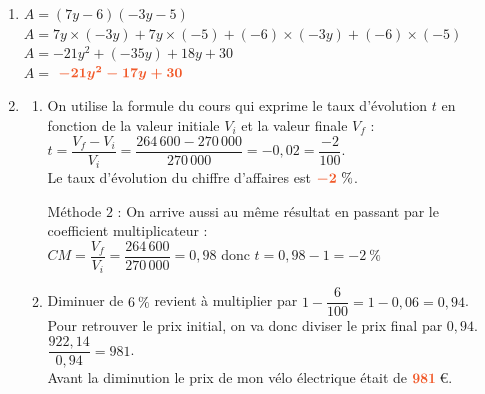 \documentclass[a4paper,11pt]{article}
\begin{document}
\begin{seance}{}
\begin{enumerate}
\item  $A =  (7y-6)(-3y-5)$ \\$A =  7y\times (-3y) + 
  7y\times (-5) +
  (-6) \times (-3y)  +
  (-6) \times (-5)$ \\$A = -21y^2 + 
  (-35y) +
  18y +
  30$ \\$A =$ ${\color[HTML]{f15929}\boldsymbol{ -21y^2-17y+30 }}$


\item 
\begin{enumerate}
\item On utilise la formule du cours qui exprime le taux d'évolution $t$ en fonction de la valeur initiale $V_i$ et la valeur finale $V_f$ : $t=\dfrac{V_f-V_i}{V_i}=\dfrac{264\,600-270\,000}{270\,000}=-0{,}02=\dfrac{-2}{100}$.\\Le taux d'évolution du chiffre d'affaires est ${\color[HTML]{f15929}\boldsymbol{-2}}~\%$.

\medskip
Méthode $2$ : On arrive aussi au même résultat en passant par le coefficient multiplicateur : \\$CM=\dfrac{V_f}{V_i}=\dfrac{264\,600}{270\,000} = 0{,}98$ donc $t = 0{,}98-1= -2~\%$
\item Diminuer de $6~\%$ revient à multiplier par $1 - \dfrac{6}{100} = 1- 0{,}06 = 0{,}94$.\\Pour retrouver le prix initial, on va donc diviser le prix final par $0{,}94$. $\dfrac{922{,}14}{0{,}94}  = 981$.\\Avant la diminution le prix de mon vélo électrique était de ${\color[HTML]{f15929}\boldsymbol{981}}$\,\euro{}.
\end{enumerate}



\end{enumerate}
\end{seance}
\end{document}
